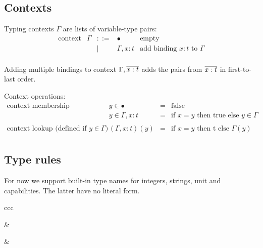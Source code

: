 \documentclass[11pt]{article}
\begin{document}
\subsection{Contexts}

\newcommand{\bnd}[2]{#1 : #2}
\newcommand{\bnds}[2]{\repo{#1 : #2}}
\newcommand{\nilc}{\bullet}
\newcommand{\consc}[2]{#1,#2}

Typing contexts $\Gamma$ are lists of variable-type pairs:
\[
\begin{array}{rlcll}
\text{context}
  & \Gamma & ::= & \nilc                      & \text{empty} \\
  &        & |   & \consc{\Gamma}{\bnd{x}{t}} & \text{add binding $x:t$ to $\Gamma$} \\
\end{array}
\]

Adding multiple bindings to context $\consc{\Gamma}{\bnds{x}{t}}$ adds the pairs from $\bnds{x}{t}$ in first-to-last order.

Context operations:
\[
\begin{array}{rrcll}
\text{context membership}
  & y \in \nilc                      & = & \text{false} \\
  & y \in \consc{\Gamma}{\bnd{x}{t}} & = & \text{if $x = y$ then true else $y \in \Gamma$} \\
\\
\text{context lookup (defined if $y \in \Gamma$)}
  & (\consc{\Gamma}{\bnd{x}{t}})(y) & = & \text{if $x = y$ then t else $\Gamma(y)$} \\
\end{array}
\]

\subsection{Type rules}

For now we support built-in type names for integers, strings, unit and capabilities.
The latter have no literal form.

\begin{rules}{ccc}


&


&

\inference[T-UNI]{
  \
}{
  \infe{\Gamma}{\unie}{\unity}
}

\end{rules}
\end{document}
